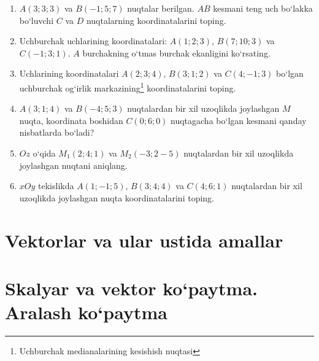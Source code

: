 \begin{enumerate}
	\item $A(3;3;3)$ va $B(-1;5;7)$ nuqtalar berilgan. $AB$ kesmani teng uch bo`lakka bo`luvchi $C$ va $D$ nuqtalarning koordinatalarini toping.
	
	\item Uchburchak uchlarining koordinatalari: $A(1;2;3)$, $B(7;10;3)$ va $C(-1;3;1)$. $A$ burchakning o`tmas burchak ekanligini ko`rsating.
	
	\item Uchlarining koordinatalari $A(2;3;4)$, $B(3;1;2)$ va $C(4;-1;3)$ bo`lgan uchburchak og`irlik markazining\footnote{Uchburchak medianalarining kesishish nuqtasi} koordinatalarini toping. 
	
	\item $A(3;1;4)$ va $B(-4;5;3)$ nuqtalardan bir xil uzoqlikda joylashgan $M$ nuqta,  koordinata boshidan $C(0;6;0)$ nuqtagacha bo`lgan kesmani qanday nisbatlarda bo`ladi?
	
	\item $Oz$ o`qida $M_1(2;4;1)$ va $M_2(-3;2-5)$ nuqtalardan bir xil uzoqlikda joylashgan nuqtani aniqlang.
	
	\item $xOy$ tekislikda $A(1;-1;5)$, $B(3;4;4)$ va $C(4;6;1)$ nuqtalardan bir xil uzoqlikda joylashgan nuqta koordinatalarini toping. 
\end{enumerate}

\section{Vektorlar va ular ustida amallar}



\section{Skalyar va vektor ko`paytma. Aralash ko`paytma}


